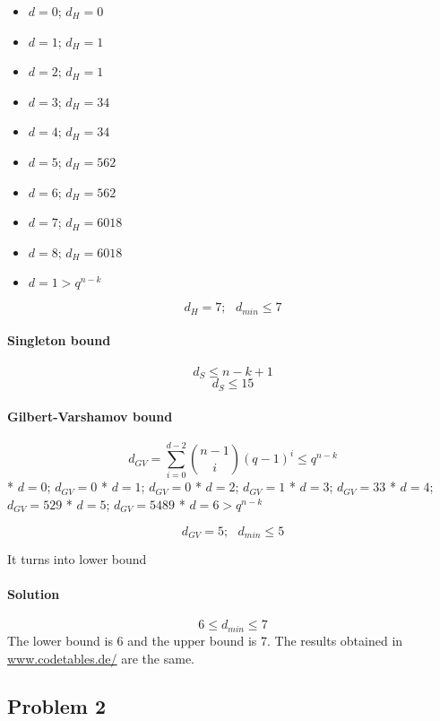 \documentclass[11pt]{article}
\providecommand{\tightlist}{%
      \setlength{\itemsep}{0pt}\setlength{\parskip}{0pt}}
\begin{document}
\begin{itemize}
\tightlist
\item
  \(d = 0\); \(d_H = 0\)
\item
  \(d = 1\); \(d_H = 1\)
\item
  \(d = 2\); \(d_H = 1\)
\item
  \(d = 3\); \(d_H = 34\)
\item
  \(d = 4\); \(d_H = 34\)
\item
  \(d = 5\); \(d_H = 562\)
\item
  \(d = 6\); \(d_H = 562\)
\item
  \(d = 7\); \(d_H = 6018\)
\item
  \(d = 8\); \(d_H = 6018\)
\item
  \(d = 1 > q^{n - k}\)
\end{itemize}

\[d_H = 7; \text{ }d_{min}≤7\]

    \hypertarget{singleton-bound}{%
\paragraph{Singleton bound}\label{singleton-bound}}

\[d_S ≤ n - k + 1\] \[d_S ≤15\]

    \hypertarget{gilbert-varshamov-bound}{%
\paragraph{Gilbert-Varshamov bound}\label{gilbert-varshamov-bound}}

\[d_{GV} = ∑_{i = 0}^{d - 2}\binom{n - 1}{i}(q - 1)^i≤q^{n - k}\] *
\(d = 0\); \(d_{GV} = 0\) * \(d = 1\); \(d_{GV} = 0\) * \(d = 2\);
\(d_{GV} = 1\) * \(d = 3\); \(d_{GV} = 33\) * \(d = 4\);
\(d_{GV} = 529\) * \(d = 5\); \(d_{GV} = 5489\) * \(d = 6 > q^{n - k}\)

\[d_{GV} = 5; \text{ }d_{min}≤5\]

It turns into lower bound

    \hypertarget{solution}{%
\paragraph{Solution}\label{solution}}

\[6\le d_{min}\le7\] The lower bound is 6 and the upper bound is 7. The
results obtained in
\href{https://www.codetables.de/}{www.codetables.de/} are the same.

    \hypertarget{problem-2}{%
\subsection{Problem 2}\label{problem-2}}
\end{document}
